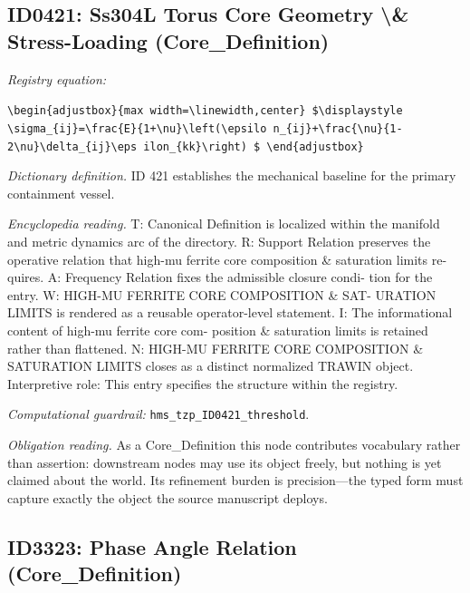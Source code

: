 \documentclass[11pt]{article}
\theoremstyle{remark}
\begin{document}
\subsection{ID0421: Ss304L Torus Core Geometry \textbackslash{}\& Stress-Loading (Core\_Definition)}

\noindent\textit{Registry equation:}\par
{\small\texttt{\textbackslash{}begin\{adjustbox\}\{max width=\textbackslash{}linewidth,center\} \$\textbackslash{}displaystyle \textbackslash{}sigma\_\{ij\}=\textbackslash{}frac\{E\}\{1+\textbackslash{}nu\}\textbackslash{}left(\textbackslash{}epsilo n\_\{ij\}+\textbackslash{}frac\{\textbackslash{}nu\}\{1-2\textbackslash{}nu\}\textbackslash{}delta\_\{ij\}\textbackslash{}eps ilon\_\{kk\}\textbackslash{}right) \$ \textbackslash{}end\{adjustbox\}}}\par\medskip
\noindent\textit{Dictionary definition.} ID 421 establishes the mechanical baseline for the primary containment vessel.\par\medskip
\noindent\textit{Encyclopedia reading.} T: Canonical Definition is localized within the manifold and metric dynamics arc of the directory. R: Support Relation preserves the operative relation that high-mu ferrite core composition \& saturation limits re- quires. A: Frequency Relation fixes the admissible closure condi- tion for the entry. W: HIGH-MU FERRITE CORE COMPOSITION \& SAT- URATION LIMITS is rendered as a reusable operator-level statement. I: The informational content of high-mu ferrite core com- position \& saturation limits is retained rather than flattened. N: HIGH-MU FERRITE CORE COMPOSITION \& SATURATION LIMITS closes as a distinct normalized TRAWIN object. Interpretive role: This entry specifies the structure within the registry.
\par\medskip\noindent\textit{Computational guardrail:} \texttt{hms\_tzp\_ID0421\_threshold}.
\par\medskip\noindent\textit{Obligation reading.} As a Core\_Definition this node contributes vocabulary rather than assertion: downstream nodes may use its object freely, but nothing is yet claimed about the world. Its refinement burden is precision---the typed form must capture exactly the object the source manuscript deploys.

\subsection{ID3323: Phase Angle Relation (Core\_Definition)}
\end{document}
